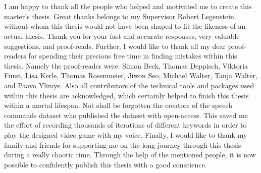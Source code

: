 
\chapter*{}
I am happy to thank all the people who helped and motivated me to create this master's thesis.
Great thanks belongs to my Supervisor Robert Legenstein without whom this thesis would not have been shaped to fit the likeness of an actual thesis.
Thank you for your fast and accurate responses, very valuable suggestions, and proof-reads.
Further, I would like to thank all my dear proof-readers for spending their precious free time in finding mistakes within this thesis.
Namely the proof-reader were: Simon Beck, Thomas Deppisch, Viktoria Fürst, Lisa Kerle, Thomas Rosenmeier, Jiwon Seo, Michael Walter, Tanja Walter, and Paavo Ylimys.
Also all contributors of the technical tools and packages used within this thesis are acknowledged, which certainly helped to finish this thesis within a mortal lifespan.
Not shall be forgotten the creators of the speech commands dataset who published the dataset with open-access.
This saved me the effort of recording thousands of iterations of different keywords in order to play the designed video game with my voice.
Finally, I would like to thank my family and friends for supporting me on the long journey through this thesis during a really chaotic time.
Through the help of the mentioned people, it is now possible to confidently publish this thesis with a good conscience.